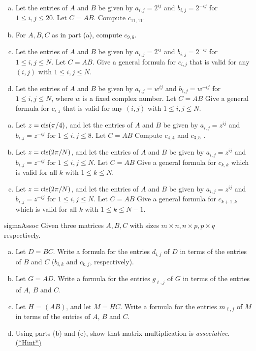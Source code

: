\begin{exercise}{}
\begin{enumerate}[(a)]
\item
Let the entries of $A$ and $B$ be given by $a_{i,j} =2^{ij}$ and $b_{i,j} =2^{-ij}$ for $1 \le i,j \le 20$. Let $C = AB$.  Compute $c_{11,11}$.
\item
For $A,B,C$ as in part (a), compute $c_{9,6}$. 
\item
Let the entries of $A$ and $B$ be given by $a_{i,j} =2^{ij}$ and $b_{i,j} =2^{-ij}$ for $1 \le i,j \le N$. Let $C = AB$.  Give a general formula for  $c_{i,j}$ that is valid for any $(i,j)$ with $1 \le i,j \le N$.
\item
Let the entries of $A$ and $B$ be given by $a_{i,j} =w^{ij}$ and $b_{i,j} =w^{-ij}$ for $1 \le i,j \le N$, where $w$ is a fixed complex number. Let $C = AB$  Give a general formula for  $c_{i,j}$ that is valid for any $(i,j)$ with $1 \le i,j \le N$.
\end{enumerate}
\end{exercise}

\begin{exercise}{}
\begin{enumerate}[(a)]
\item
Let $z= \operatorname{cis}(\pi/4)$, and let the entries of $A$ and $B$ be given by $a_{i,j} =z^{ij}$ and $b_{i,j} =z^{-ij}$ for $1 \le i,j \le 8$. Let $C = AB$  Compute $c_{4,4}$ and $c_{3,5}$ .
\item
Let $z= \operatorname{cis}(2\pi/N)$, and let the entries of $A$ and $B$ be given by $a_{i,j} =z^{ij}$ and $b_{i,j} =z^{-ij}$ for $1 \le i,j \le N$. Let $C = AB$  Give a general formula for $c_{k,k}$ which is valid for all $k$ with $1 \le k \le N$.
\item
Let $z= \operatorname{cis}(2\pi/N)$, and let the entries of $A$ and $B$ be given by $a_{i,j} =z^{ij}$ and $b_{i,j} =z^{-ij}$ for $1 \le i,j \le N$. Let $C = AB$  Give a general formula for $c_{k+1,k}$ which is valid for all $k$ with $1 \le k \le N-1$.
\end{enumerate}
\end{exercise}

\begin{exercise}{sigmaAssoc}
Given three matrices $A, B, C$ with sizes $m \times n, n \times p, p \times q$ respectively.
\begin{enumerate}[(a)]
\item
Let $D = BC$.  Write a formula for the entries $d_{i,j}$ of $D$ in terms of the entries of $B$ and $C$ ($b_{i,k}$ and $c_{k,j}$, respectively). 
\item
Let $G = AD$.  Write a formula for the entries $g_{\ell,j}$ of $G$ in terms of the entries of $A$, $B$ and $C$.
\item
Let $H$ =  $(AB)$, and let $M = HC$. Write a formula for the entries $m_{\ell,j}$ of $M$ in terms of the entries of $A$, $B$ and $C$.
\item
Using parts (b) and (c), show that matrix multiplication is \emph{associative}. 
\hyperref[sec:sigma:hints]{(*Hint*)} 
\end{enumerate}
\end{exercise}


